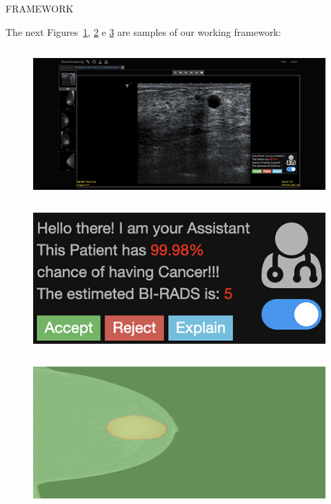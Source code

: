 \documentclass[final]{beamer}
\begin{document}
\begin{frame}[t, fragile = singleslide]{}
\begin{columns}[t]
\end{columns}

\begin{columns}[t]

\begin{column}{0.945\textwidth}

\begin{block}{FRAMEWORK}

The next Figures~\ref{fig:fig002}, \ref{fig:fig003} e \ref{fig:fig004} are samples of our working framework:

\begin{column}[T]{0.33\textwidth}
\begin{figure}[!htb]
\centering
\caption{}
\label{fig:fig002}
\includegraphics[width = 0.75\columnwidth]{./figures/fig002}
\source{}
\end{figure}
\end{column}
{\color{PosterBars}\vrule width 1.5pt}
\begin{column}[T]{0.33\textwidth}
\begin{figure}[!htb]
\centering
\caption{}
\label{fig:fig003}
\includegraphics[width = 0.75\columnwidth]{./figures/fig003}
\source{}
\end{figure}
\end{column}
{\color{PosterBars}\vrule width 1.5pt}
\begin{column}[T]{0.33\textwidth}
\begin{figure}[!htb]
\centering
\caption{}
\label{fig:fig004}
\includegraphics[width = 0.75\columnwidth]{./figures/fig004}
\source{}
\end{figure}
\end{column}


\end{block}
\end{column}
\end{columns}
\end{frame}
\end{document}

